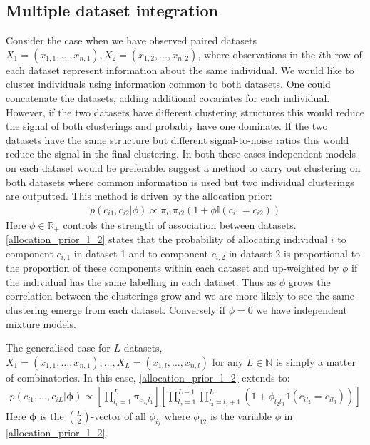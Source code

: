 \documentclass[12pt]{article} %
\begin{document}
	\subsection{Multiple dataset integration}
	Consider the case when we have observed paired datasets $X_1 = (x_{1,1},\ldots,x_{n,1}), X_2 = (x_{1,2},\ldots,x_{n,2})$, where observations in the $i$th row of each dataset represent information about the same individual. We would like to cluster individuals using information common to both datasets. One could concatenate the datasets, adding additional covariates for each individual. However, if the two datasets have different clustering structures this would reduce the signal of both clusterings and probably have one dominate. If the two datasets have the same structure but different signal-to-noise ratios this would reduce the signal in the final clustering. In both these cases independent models on each dataset would be preferable. \citet{kirk_bayesian_2012} suggest a method to carry out clustering on both datasets where common information is used but two individual clusterings are outputted. This method is driven by the allocation prior:
	\begin{align} \label{allocation_prior_l_2}
	p(c_{i1}, c_{i2} | \phi ) \propto \pi_{i1} \pi_{i2} (1 + \phi \mathbb{I}(c_{i1} = c_{i2}))
	\end{align}
	Here $\phi \in \mathbb{R}_+$ controls the strength of association between datasets. \eqref{allocation_prior_l_2} states that the probability of allocating individual $i$ to component $c_{i,1}$ in dataset 1 and to component $c_{i,2}$ in dataset 2 is proportional to the proportion of these components within each dataset and up-weighted by $\phi$ if the individual has the same labelling in each dataset. Thus as $\phi$ grows the correlation between the clusterings grow and we are more likely to see the same clustering emerge from each dataset. Conversely if $\phi = 0$ we have independent mixture models. 
	
	The generalised case for $L$ datasets, $X_1 = (x_{1,1},\ldots,x_{n,1}),\ldots, X_L = (x_{1,l},\ldots,x_{n,l})$ for any $L \in \mathbb{N}$ is simply a matter of combinatorics. In this case, \eqref{allocation_prior_l_2} extends to:
	\begin{align} \label{allocation_prior}
	p(c_{i1},\ldots,c_{iL} | \boldsymbol{\phi}) \propto \left[\prod_{l_1=1}^L\pi_{c_{il_1}l_1} \right]\left[\prod_{l_2=1}^{L-1}\prod_{l_3=l_2+1}^L\left(1+\phi_{l_2l_3}\mathbb{1}(c_{il_2} = c_{il_3}) \right)\right]
	\end{align}
	Here $\boldsymbol{\phi}$ is the ${L \choose 2}$-vector of all $\phi_{ij}$ where $\phi_{12}$ is the variable $\phi$ in \eqref{allocation_prior_l_2}.
	
\end{document}
